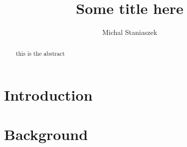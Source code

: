 \documentclass[10pt,a4paper]{article}
\author{Michal Staniaszek}
\title{Some title here}
\begin{document}
\maketitle
\begin{abstract}
  this is the abstract
\end{abstract}
\section{Introduction}
\section{Background}
\nocite{*}
\printbibliography
\end{document}
